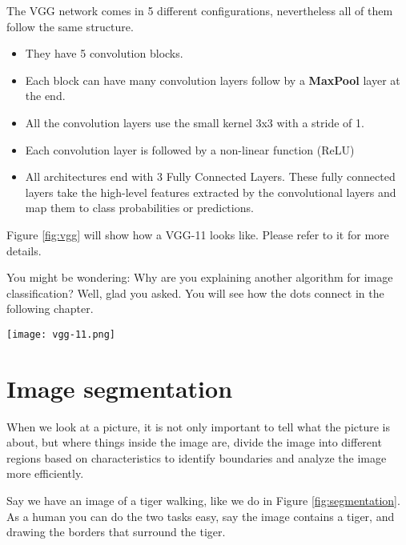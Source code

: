 \documentclass[10pt, twocolumn]{article}
\begin{document}
The VGG network comes in 5 different configurations, nevertheless all of them
follow the same structure.

\begin{itemize}
    \item They have 5 convolution blocks.
    \item Each block can have many convolution layers follow by a
        \textbf{MaxPool} layer at the end.
    \item All the convolution layers use the small kernel 3x3 with a stride of
        1.
    \item Each convolution layer is followed by a non-linear function (ReLU)
    \item All architectures end with 3 Fully Connected Layers. These fully
        connected layers take the high-level features extracted by the
        convolutional layers and map them to class probabilities or
        predictions.
\end{itemize}

Figure \ref{fig:vgg} will show how a VGG-11 looks like. Please refer to it
for more details.

You might be wondering: Why are you explaining another algorithm for image
classification? Well, glad you asked. You will see how the dots connect in the
following chapter.

\begin{figure*}[ht]
  \centering
  \texttt{[image: vgg-11.png]}
    \caption{Block diagram of the VGG11 architecture, taken from
        https://medium.com/coinmonks/paper-review-of-vggnet-1st-runner-up-of-ilsvlc-2014-image-classification-d02355543a11}
    \label{fig:vgg}
\end{figure*}

\section{Image segmentation}

When we look at a picture, it is not only important to tell what the picture is
about, but where things inside the image are, divide the image into different
regions based on characteristics to identify boundaries and analyze the image
more efficiently.

Say we have an image of a tiger walking, like we do in Figure
\ref{fig:segmentation}.  As a human you can do the two tasks easy, say the
image contains a tiger, and drawing the borders that surround the tiger.
\end{document}

